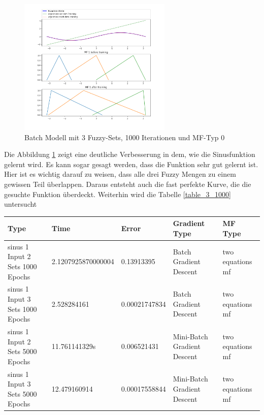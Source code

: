 {\begin{figure}[htbp]
	\centering
	\includegraphics[width=0.65\textwidth]{images/sinus/Batch/sinus 1 Input 3 Sets 1000 Epochs Batch Gradient Descent two equations mf.png}
	\caption{Batch Modell mit 3 Fuzzy-Sets, 1000 Iterationen und MF-Typ 0} \label{batch_3_1000}
\end{figure}

Die Abbildung \ref{batch_3_1000} zeigt eine deutliche Verbesserung in dem, wie die Sinusfunktion gelernt wird. Es kann sogar gesagt werden, dass die Funktion sehr gut gelernt ist. Hier ist es wichtig darauf zu weisen, dass alle drei Fuzzy Mengen zu einem gewissen Teil überlappen. Daraus entsteht auch die fast perfekte Kurve, die die gesuchte Funktion überdeckt.
Weiterhin wird die Tabelle \ref{table_3_1000} untersucht

\begin{center}
	\begin{minipage}{\textwidth}
	\begin{tabular}{ | p{3cm} | l | l | p{3cm} | p{3cm} |}
		\hline
		Type & Time & Error & Gradient Type & MF Type \\ \hline
		sinus 1 Input 2 Sets 1000 Epochs&2.1207925870000004&0.13913395&Batch Gradient Descent&two equations mf \\ \hline
		sinus 1 Input 3 Sets 1000 Epochs&2.528284161&0.00021747834&Batch Gradient Descent&two equations mf
		\\ \hline
		sinus 1 Input 2 Sets 5000 Epochs&11.761141329s&0.006521431&Mini-Batch Gradient Descent&two equations mf \\ \hline
		sinus 1 Input 3 Sets 5000 Epochs&12.479160914&0.00017558844&Mini-Batch Gradient Descent&two equations mf\\ \hline	
	\end{tabular}
	\label{table_3_1000}
\end{minipage}
\end{center}

}
